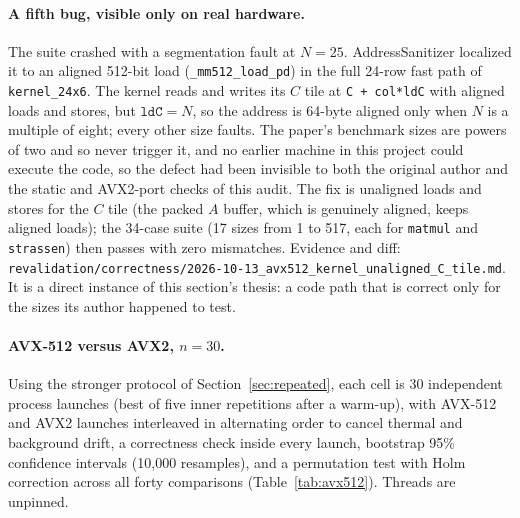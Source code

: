 \documentclass[acmsmall]{acmart}
\begin{document}
\paragraph{A fifth bug, visible only on real hardware.}
The suite crashed with a segmentation fault at $N{=}25$.
AddressSanitizer localized it to an aligned 512-bit load
(\texttt{\_mm512\_load\_pd}) in the full 24-row fast path of
\texttt{kernel\_24x6}. The kernel reads and writes its $C$ tile at
\texttt{C + col*ldC} with aligned loads and stores, but
$\texttt{ldC}{=}N$, so the address is 64-byte aligned only when $N$ is a
multiple of eight; every other size faults. The paper's benchmark sizes
are powers of two and so never trigger it, and no earlier machine in
this project could execute the code, so the defect had been invisible
to both the original author and the static and AVX2-port checks of this
audit. The fix is unaligned loads and stores for the $C$ tile (the
packed $A$ buffer, which is genuinely aligned, keeps aligned loads); the
34-case suite (17 sizes from 1 to 517, each for \texttt{matmul} and
\texttt{strassen}) then passes with zero mismatches. Evidence and diff:
\texttt{revalidation/correctness/2026-10-13\_avx512\_kernel\_unaligned\_C\_tile.md}.
It is a direct instance of this section's thesis: a code path that is
correct only for the sizes its author happened to test.

\paragraph{AVX-512 versus AVX2, $n{=}30$.}
Using the stronger protocol of Section~\ref{sec:repeated}, each cell is
30 independent process launches (best of five inner repetitions after a
warm-up), with AVX-512 and AVX2 launches interleaved in alternating order
to cancel thermal and background drift, a correctness check inside every
launch, bootstrap 95\% confidence intervals (10{,}000 resamples), and a
permutation test with Holm correction across all forty comparisons
(Table~\ref{tab:avx512}). Threads are unpinned.
\end{document}
